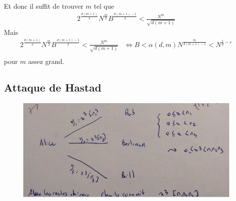             Et donc il suffit de trouver $m$ tel que
            \begin{align*}
                2^{\frac{d(m + 1)}4} N^{\frac m2} B^{\frac{d(m + 1) - 1}2} < \frac{N^m}{\sqrt{d(m + 1)}}
            \end{align*}
            Mais
            \begin{align*}
                2^{\frac{d(m + 1)}4} N^{\frac m2} B^{\frac{d(m + 1) - 1}2} < \frac{N^m}{\sqrt{d(m + 1)}} &\iff B < \alpha(d, m) N^{\frac m{d(m + 1) - 1}}  < N^{\frac 1d - \varepsilon} \\
            \end{align*}
            pour $m$ assez grand. 

        \subsection{Attaque de Hastad}
            \begin{figure}[H]
                \centering
                \includegraphics[width=.7\textwidth]{pictures/08}
            \end{figure} \noindent

